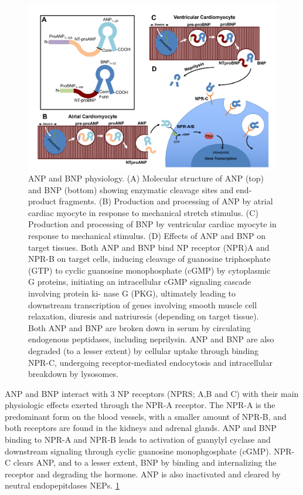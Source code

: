 \documentclass[14pt,a4paper,onecolumn]{extarticle}
\begin{document}
\begin{figure}

    \centering

    \includegraphics[scale=0.4]{../../images/NP_physiology.png}

    \caption{ANP and BNP physiology. (A) Molecular structure of ANP (top) and BNP (bottom) showing enzymatic cleavage sites and end-product fragments. (B) Production and processing of ANP by atrial cardiac myocyte in response to mechanical stretch stimulus. (C) Production and processing of BNP by ventricular cardiac myocyte in response to mechanical stimulus. (D) Effects of ANP and BNP on target tissues. Both ANP and BNP bind NP receptor (NPR)A and NPR-B on target cells, inducing cleavage of guanosine triphosphate (GTP) to cyclic guanosine monophosphate (cGMP) by cytoplasmic G proteins, initiating an intracellular cGMP signaling cascade involving protein ki- nase G (PKG), ultimately leading to downstream transcription of genes involving smooth muscle cell relaxation, diuresis and natriuresis (depending on target tissue). Both ANP and BNP are broken down in serum by circulating endogenous peptidases, including neprilysin. ANP and BNP are also degraded (to a lesser extent) by cellular uptake through binding NPR-C, undergoing receptor-mediated endocytosis and intracellular breakdown by lysosomes. \citep{Maisel2018}}

    \label{NP_physiology}

\end{figure}

ANP and BNP interact with 3 NP receptors (NPRS; A,B and C)  with their main physiologic effects exerted through the NPR-A receptor.  The NPR-A is the predominant form on the blood vessels, with a smaller amount of NPR-B, and both receptors are found in the kidneys and adrenal glands.  ANP and BNP binding to NPR-A and NPR-B leads to activation of guanylyl cyclase and downstream signaling through cyclic guanosine monophgosphate (cGMP).  NPR-C clears ANP, and to a lesser extent, BNP by binding and internalizing the receptor and degrading the hormone.  ANP is also inactivated and cleared by neutral endopepitdases NEPs. \ref{NP_physiology} \citep{Maisel2018}  %
\end{document}
